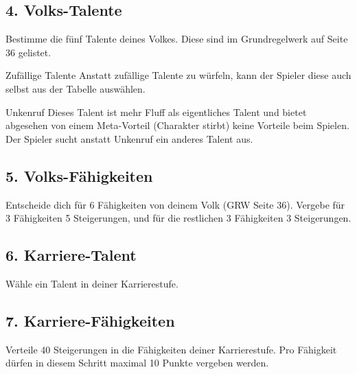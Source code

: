 \documentclass[a4paper,10pt,twoside,twocolumn,openany,nodeprecatedcode,bg=print]{dndbook}
\begin{document}
\subsection[]{4. Volks-Talente}
Bestimme die fünf Talente deines Volkes. Diese sind im Grundregelwerk auf Seite 36 gelistet.

\begin{DndComment}{Zufällige Talente}
  Anstatt zufällige Talente zu würfeln, kann der Spieler diese auch selbst aus der Tabelle auswählen.
\end{DndComment}

\begin{DndComment}{Unkenruf}
  Dieses Talent ist mehr Fluff als eigentliches Talent und bietet abgesehen von einem Meta-Vorteil (Charakter stirbt) keine Vorteile beim Spielen.
  Der Spieler sucht anstatt Unkenruf ein anderes Talent aus.
\end{DndComment}

\subsection[]{5. Volks-Fähigkeiten}
Entscheide dich für 6 Fähigkeiten von deinem Volk (GRW Seite 36).
Vergebe für 3 Fähigkeiten 5 Steigerungen, und für die restlichen 3 Fähigkeiten 3 Steigerungen.

\subsection[]{6. Karriere-Talent}
Wähle ein Talent in deiner Karrierestufe.

\subsection[]{7. Karriere-Fähigkeiten}
Verteile 40 Steigerungen in die Fähigkeiten deiner Karrierestufe.
Pro Fähigkeit dürfen in diesem Schritt maximal 10 Punkte vergeben werden.
\end{document}
